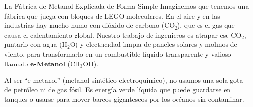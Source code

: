 \documentclass[11pt,a4paper]{article}
\begin{document}
\begin{pedagogico}{La Fábrica de Metanol Explicada de Forma Simple}
Imaginemos que tenemos una fábrica que juega con bloques de LEGO moleculares. 
En el aire y en las industrias hay mucho humo con dióxido de carbono ($\text{CO}_2$), que es el gas que causa el calentamiento global. Nuestro trabajo de ingenieros es atrapar ese $\text{CO}_2$, juntarlo con agua ($\text{H}_2\text{O}$) y electricidad limpia de paneles solares y molinos de viento, para transformarlo en un combustible líquido transparente y valioso llamado \textbf{e-Metanol} ($\text{CH}_3\text{OH}$).

Al ser ``e-metanol'' (metanol sintético electroquímico), no usamos una sola gota de petróleo ni de gas fósil. Es energía verde líquida que puede guardarse en tanques o usarse para mover barcos gigantescos por los océanos sin contaminar.
\end{pedagogico}
\end{document}
